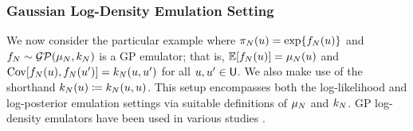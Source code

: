 \documentclass[12pt]{article}
\begin{document}
\subsubsection{Gaussian Log-Density Emulation Setting} \label{sec:ldens-Gaussian}
We now consider the particular example where $\pi_{N}(u) = \exp\mathopen{}\left\{f_{N}(u)\right\}\mathclose{}$
and $f_{N} \sim \mathcal{GP}(\mu_{N}, k_{N})$ is a GP emulator; that is, 
$\mathbb{E}[f_{N}(u)] = \mu_{N}(u)$ and 
$\mathrm{Cov}[f_{N}(u),f_{N}(u^\prime)] = k_{N}(u, u^\prime)$ for all 
$u, u^\prime \in \mathsf{U}$. We also make use of the shorthand 
$k_{N}(u) \coloneqq k_{N}(u, u)$. This setup encompasses both the log-likelihood
and log-posterior emulation settings via suitable definitions of $\mu_{N}$ and $k_{N}$.
GP log-density emulators have been used in various studies 
\citep{VehtariParallelGP,FATES_CES,trainDynamics,quantileApprox,ActiveLearningMCMC,FerEmulation,
StuartTeck1,random_fwd_models,GP_PDE_priors,OakleyllikEm,JosephMinEnergy,AlawiehIterativeGP}.
\end{document}
